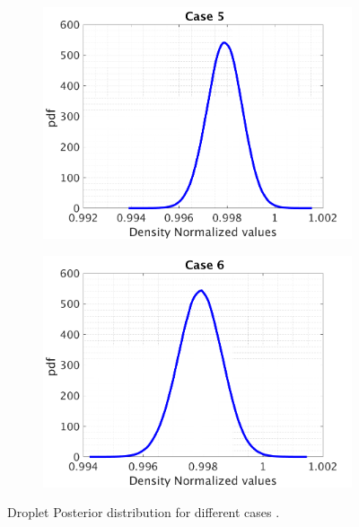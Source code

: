 \documentclass{article}
\begin{document}
\begin{figure}[H]
\begin{center}
\begin{subfigure}{0.4\textwidth}
    \centering\includegraphics[width=1.1\textwidth,keepaspectratio]{images/inverse_problem/infer_drag/case5/density_PDF.png}
    \caption{\centering }
  \end{subfigure}
  \begin{subfigure}{0.4\textwidth}
    \centering\includegraphics[width=1.1\textwidth,keepaspectratio]{images/inverse_problem/infer_drag/case6/density_PDF.png}
    \caption{\centering}
  \end{subfigure}

\caption{Droplet Posterior distribution for different cases .}
\label{fig:density_cases} 
 \end{center}
\end{figure}
\end{document}

